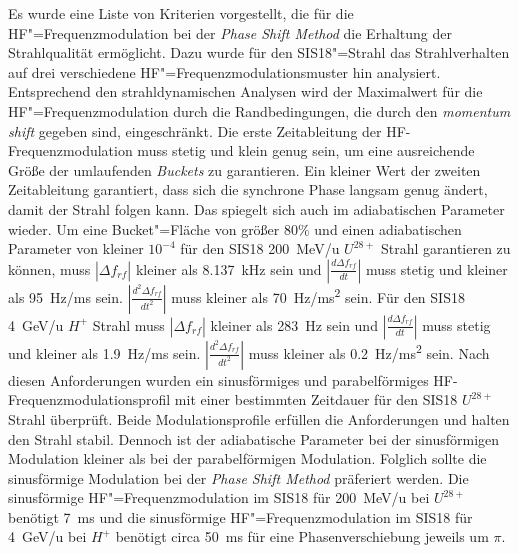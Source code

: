 Es wurde eine Liste von Kriterien vorgestellt, die f\"ur die HF"=Frequenzmodulation bei der \textit{Phase Shift Method} die Erhaltung der Strahlqualit\"at erm\"oglicht. Dazu wurde f\"ur den SIS18"=Strahl das Strahlverhalten auf drei verschiedene HF"=Frequenzmodulationsmuster hin analysiert. Entsprechend den strahldynamischen Analysen wird der Maximalwert f\"ur die HF"=Frequenzmodulation durch die Randbedingungen, die durch den \textit{momentum shift} gegeben sind, eingeschr\"ankt. Die erste Zeitableitung der HF-Frequenzmodulation muss stetig und klein genug sein, um eine ausreichende Gr\"oße der umlaufenden \textit{Buckets}  zu garantieren. Ein kleiner Wert der zweiten Zeitableitung garantiert,  dass sich die synchrone Phase langsam genug ändert, damit der Strahl folgen kann. Das spiegelt sich auch im adiabatischen Parameter wieder. Um eine Bucket"=Fl\"ache von größer 80$\%$  und einen adiabatischen Parameter von kleiner $10^{-4}$ f\"ur den SIS18 \SI{200}{MeV/u} $U^\mathit{28+}$ Strahl garantieren zu k\"onnen, muss $|\Delta f_{\mathit{rf}}|$ kleiner als \SI{8.137}{kHz} sein und $|\frac{d\Delta f_{\mathit{rf}}}{dt}|$ muss stetig und kleiner als \SI{95}{Hz/ms} sein. $|\frac{d^2\Delta f_{\mathit{rf}}}{dt^2}|$ muss kleiner als \SI{70}{Hz/ms^2} sein. Für den SIS18 \SI{4}{GeV/u} $H^{+}$ Strahl muss $|\Delta f_{\mathit{rf}}|$ kleiner als \SI{283}{Hz} sein und $|\frac{d\Delta f_{\mathit{rf}}}{dt}|$ muss stetig und kleiner als \SI{1.9}{Hz/ms} sein. $|\frac{d^2\Delta f_{\mathit{rf}}}{dt^2}|$ muss kleiner als \SI{0.2}{Hz/ms^2} sein. Nach diesen Anforderungen wurden ein sinusförmiges und parabelförmiges HF-Frequenzmodulationsprofil mit einer bestimmten Zeitdauer f\"ur den SIS18 $U^{28+}$ Strahl \"uberpr\"uft. Beide Modulationsprofile erfüllen die Anforderungen und halten den Strahl stabil. Dennoch ist der adiabatische Parameter bei der sinusf\"ormigen Modulation kleiner als bei der parabelförmigen Modulation. Folglich sollte die sinusförmige Modulation bei der \textit{Phase Shift Method} pr\"aferiert werden. Die sinusf\"ormige HF"=Frequenzmodulation im SIS18 f\"ur \SI{200}{MeV/u} bei $U^\mathit{28+}$ ben\"otigt \SI{7}{\ms} und die sinusf\"ormige HF"=Frequenzmodulation im SIS18 f\"ur \SI{4}{GeV/u} bei $H^+$ ben\"otigt circa \SI{50}{\ms} f\"ur eine Phasenverschiebung jeweils um $\pi$.   

